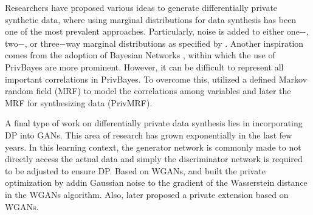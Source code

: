 Researchers have proposed various ideas to generate differentially private synthetic data, where using marginal distributions for data synthesis has been one of the most prevalent approaches. Particularly, noise is added to either one$-$, two$-$, or three$-$way marginal distributions
as specified by \citet{mckenna2019graphical}. Another inspiration comes from the adoption of Bayesian Networks \citep{bao2021synthetic}, within which the use of PrivBayes \citet{zhang2017privbayes} are more prominent. However, it can be difficult to 
represent all important correlations in PrivBayes. To overcome this, \citet{cai2021data} utilized a defined Markov random field (MRF) to model the correlations among variables and later the MRF for synthesizing data (PrivMRF).

A final type of work on differentially private data synthesis lies in incorporating DP into GANs. This area of research has grown exponentially in the last few years. 
In this learning context, the generator network is commonly made to not directly access the actual data and simply the discriminator network is required to be adjusted
to ensure DP. Based on WGANs, \citet{xie2018differentially} and \citet{beaulieu2019privacy} built the private optimization by addin Gaussian noise to the 
gradient of the Wasserstein distance in the WGANs algorithm. Also, \citet{frigerio2019differentially} later proposed a private extension based on WGANs.
